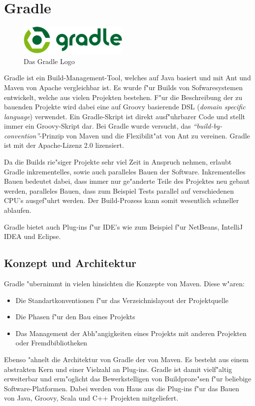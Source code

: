 \section{Gradle}
\begin{figure}[h]
	\begin{center}
		\includegraphics{./fig/gradle_logo.png}
		\caption{Das Gradle Logo}
		\label{fig:gradle_logo}
	\end{center}
\end{figure}
Gradle ist ein Build-Management-Tool, welches auf Java basiert und mit Ant und Maven von Apache vergleichbar ist. Es wurde f"ur Builds  von Sofwaresystemen entwickelt, welche aus vielen Projekten bestehen.
F"ur die Beschreibung der zu bauenden Projekte wird dabei eine auf Groovy basierende DSL (\textit{domain specific language}) verwendet.
Ein Gradle-Skript ist direkt ausf"uhrbarer Code und stellt immer ein Groovy-Skript dar.
Bei Gradle wurde versucht, das \textit{``build-by-convention''}-Prinzip von Maven und die Flexibilit"at von Ant zu vereinen.
Gradle ist mit der Apache-Lizenz 2.0 lizensiert.

Da die Builds rie"siger Projekte sehr viel Zeit in Anspruch nehmen, erlaubt Gradle inkrementelles, sowie auch paralleles Bauen der Software.
Inkrementelles Bauen bedeutet dabei, dass immer nur ge"anderte Teile des Projektes neu gebaut werden, paralleles Bauen, dass zum Beispiel Tests parallel auf verschiedenen CPU's ausgef"uhrt werden.
Der Build-Prozess kann somit wesentlich schneller ablaufen.

Gradle bietet auch Plug-ins f"ur IDE's wie zum Beispiel f"ur NetBeans, IntelliJ IDEA und Eclipse.

\subsection{Konzept und Architektur}
Gradle "ubernimmt in vielen hinsichten die Konzepte von Maven. Diese w"aren:
\begin{itemize}
	\item Die Standartkonventionen f"ur das Verzeichnislayout der Projektquelle
	\item Die Phasen f"ur den Bau eines Projekts
	\item Das Management der Abh"angigkeiten eines Projekts mit anderen Projekten oder Fremdbibliotheken
\end{itemize}
Ebenso "ahnelt die Architektur von Gradle der von Maven.
Es besteht aus einem abstrakten Kern und einer Vielzahl an Plug-ins. Gradle ist damit vielf"altig erweiterbar und erm"oglicht das Bewerkstelligen von Buildproze"sen f"ur beliebige Software-Platformen.
Dabei werden von Haus aus die Plug-ins f"ur das Bauen von Java, Groovy, Scala und C++ Projekten mitgeliefert.

